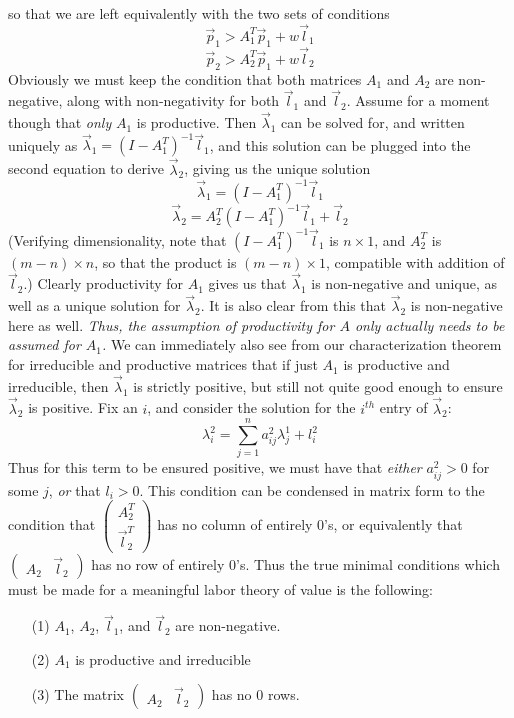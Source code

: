 \documentclass{article}
\theoremstyle{definition}
\theoremstyle{plain}
\theoremstyle{theorem}
\begin{document}
so that we are left equivalently with the two sets of conditions
\[  \vec{p}_1 > A_1^T\vec{p}_1 + w\vec{l}_1 \]
\[  \vec{p}_2 > A_2^T\vec{p}_1 + w\vec{l}_2 \]
Obviously we must keep the condition that both matrices $A_1$ and $A_2$ are non-negative, along with non-negativity for both $\vec{l}_1$ and $\vec{l}_2$. Assume for a moment though that \emph{only} $A_1$ is productive. Then $\vec{\lambda}_1$ can be solved for, and written uniquely as $\vec{\lambda}_1 = (I-A_1^T)^{-1}\vec{l}_1$, and this solution can be plugged into the second equation to derive $\vec{\lambda}_2$, giving us the unique solution
\[ \vec{\lambda}_1 = (I-A_1^T)^{-1}\vec{l}_1 \]
\[ \vec{\lambda}_2 = A_2^T(I-A_1^T)^{-1}\vec{l}_1 + \vec{l}_2 \]
(Verifying dimensionality, note that $(I-A_1^T)^{-1}\vec{l}_1$ is $n\times 1$, and $A_2^T$ is $(m-n) \times n$, so that the product is $(m-n)\times 1$, compatible with addition of $\vec{l}_2$.) Clearly productivity for $A_1$ gives us that $\vec{\lambda}_1$ is non-negative and unique, as well as a unique solution for $\vec{\lambda}_2$. It is also clear from this that $\vec{\lambda}_2$ is non-negative here as well. \emph{Thus, the assumption of productivity for $A$ only actually needs to be assumed for $A_1$.} We can immediately also see from our characterization theorem for irreducible and productive matrices that if just $A_1$ is productive and irreducible, then $\vec{\lambda}_1$ is strictly positive, but still not quite good enough to ensure $\vec{\lambda}_2$ is positive. Fix an $i$, and consider the solution for the $i^{th}$ entry of $\vec{\lambda}_2$:
\[ \lambda^2_i = \sum_{j=1}^n a^2_{ij}\lambda^1_j + l^2_i \]
Thus for this term to be ensured positive, we must have that \emph{either} $a^2_{ij} > 0$ for some $j$, \emph{or} that $l_i > 0$. This condition can be condensed in matrix form to the condition that $\begin{pmatrix} A^T_2 \\ \vec{l}_2^T \end{pmatrix}$ has no column of entirely $0$'s, or equivalently that $\begin{pmatrix} A_2 & \vec{l}_2 \end{pmatrix}$ has no row of entirely $0$'s. Thus the true minimal conditions which must be made for a meaningful labor theory of value is the following:
\begin{itemize}
	\item[(1)] $A_1$, $A_2$, $\vec{l}_1$, and $\vec{l}_2$ are non-negative.
	\item[(2)] $A_1$ is productive and irreducible
	\item[(3)] The matrix $\begin{pmatrix} A_2 & \vec{l}_2 \end{pmatrix}$ has no $0$ rows.
\end{itemize} 
\end{document}

